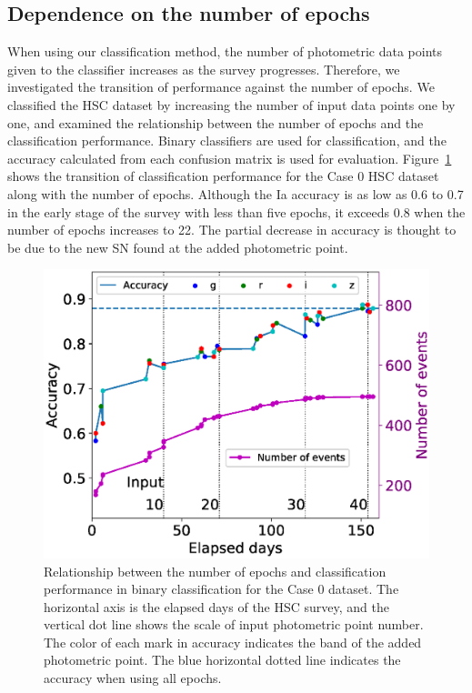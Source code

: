 \documentclass[proof]{pasj01}
\begin{document}
\subsection{Dependence on the number of epochs}
%
When using our classification method, the number of photometric data points given to the classifier increases as the survey progresses.
Therefore, we investigated the transition of performance against the number of epochs.
We classified the HSC dataset by increasing the number of input data points one by one, and examined the relationship between the number of epochs and the classification performance.
Binary classifiers are used for classification, and the accuracy calculated from each confusion matrix is used for evaluation.
Figure\ \ref{fig:n_observations} shows the transition of classification performance for the Case 0 HSC dataset along with the number of epochs.
Although the Ia accuracy is as low as 0.6 to 0.7 in the early stage of the survey with less than five epochs, it exceeds 0.8 when the number of epochs increases to 22.
The partial decrease in accuracy is thought to be due to the new SN found at the added photometric point.
%
\begin{figure}[htbp]
  \begin{center}
     \includegraphics[width=\columnwidth]{figures/n_observations_v2_case0.eps}
  \end{center}
  \caption{%
  Relationship between the number of epochs and classification performance in binary classification for the Case 0 dataset. 
  The horizontal axis is the elapsed days of the HSC survey, and the vertical dot line shows the scale of input photometric point number. 
  The color of each mark in accuracy indicates the band of the added photometric point. 
  The blue horizontal dotted line indicates the accuracy when using all epochs.
  }%
  \label{fig:n_observations}
\end{figure}
%
\end{document}
